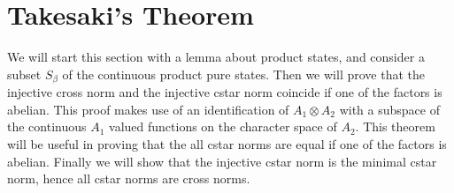 \documentclass{article}
\theoremstyle{plain}
\theoremstyle{definition}
\theoremstyle{remark}
\begin{document}
\section{Takesaki's Theorem}

We will start this section with a lemma about product states, and 
consider a subset $S_\beta$ of the continuous product pure states.
Then we will prove that the injective cross norm and the injective
cstar norm coincide if one of the factors is abelian. This proof makes
use of an identification of $A_1 \otimes A_2$ with a subspace
of the continuous $A_1$ valued functions on the character space of $A_2.$
This theorem will be useful in proving that the all cstar norms are
equal if one of the factors is abelian. Finally we will show that
the injective cstar norm is the minimal cstar norm, hence all
cstar norms are cross norms.
\end{document}
